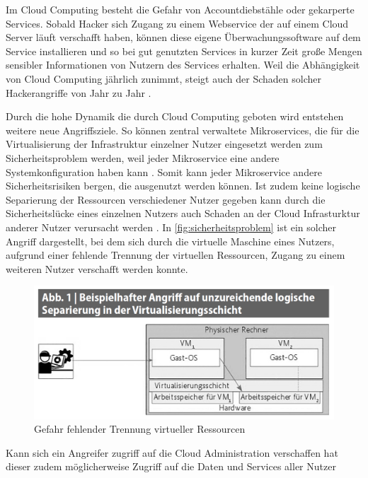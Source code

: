 Im Cloud Computing besteht die Gefahr von Accountdiebstähle oder gekarperte Services. 
Sobald Hacker sich Zugang zu einem Webservice der auf einem Cloud Server läuft verschafft haben, 
können diese eigene Überwachungssoftware auf dem Service installieren 
und so bei gut genutzten Services in kurzer Zeit große Mengen sensibler Informationen von Nutzern des Services erhalten.
Weil die Abhängigkeit von Cloud Computing jährlich zunimmt, 
steigt auch der Schaden solcher Hackerangriffe von Jahr zu Jahr \cite{jabbar2020}. 
 
Durch die hohe Dynamik die durch Cloud Computing geboten wird entstehen weitere neue Angriffsziele. So können zentral verwaltete Mikroservices, die für die Virtualisierung der Infrastruktur einzelner Nutzer eingesetzt werden zum Sicherheitsproblem werden, weil jeder Mikroservice eine andere Systemkonfiguration haben kann \cite{chen2019}. Somit kann jeder Mikroservice andere Sicherheitsrisiken bergen, die ausgenutzt werden können. Ist zudem keine logische Separierung der Ressourcen verschiedener Nutzer gegeben kann durch die Sicherheitslücke eines einzelnen Nutzers auch Schaden an der Cloud Infrasturktur anderer Nutzer verursacht werden \cite{wehrhahn-aklender2019}. In \autoref{fig:sicherheitsproblem} ist ein solcher Angriff dargestellt, bei dem sich durch die virtuelle Maschine eines Nutzers, aufgrund einer fehlende Trennung der virtuellen Ressourcen, Zugang zu einem weiteren Nutzer verschafft werden konnte. 

\begin{figure}[b]
	\centering
	\includegraphics[width=\linewidth]{images/sicherheitsproblem.png}	
	\caption{Gefahr fehlender Trennung virtueller Ressourcen}
	\label{fig:sicherheitsproblem}
\end{figure}

 Kann sich ein Angreifer zugriff auf die Cloud Administration verschaffen hat dieser zudem möglicherweise Zugriff auf die Daten und Services aller Nutzer \cite{wehrhahn-aklender2019}

